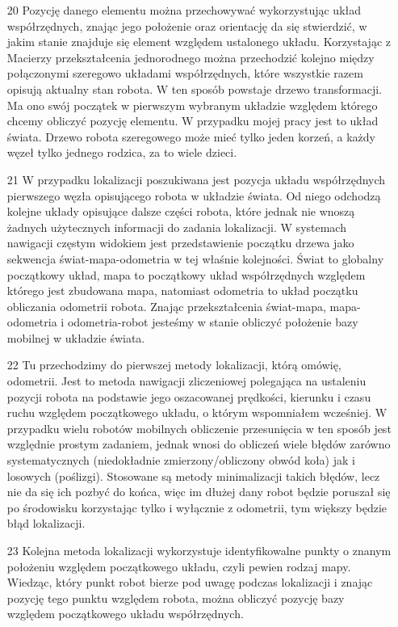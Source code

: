 \documentclass[20pt,a4paper]{article}
\begin{document}
\begin{itemize}
		\item[20]
	Pozycję danego elementu można przechowywać wykorzystując układ współrzędnych, znając jego położenie oraz orientację da się stwierdzić, w jakim stanie znajduje się element względem ustalonego układu.
Korzystając z Macierzy przekształcenia jednorodnego można przechodzić kolejno między połączonymi szeregowo układami współrzędnych, które wszystkie razem opisują aktualny stan robota.
W ten sposób powstaje drzewo transformacji. Ma ono swój początek w pierwszym wybranym układzie względem którego chcemy obliczyć pozycję elementu.
W przypadku mojej pracy jest to układ świata.
Drzewo robota szeregowego może mieć tylko jeden korzeń, a każdy węzeł tylko jednego rodzica, za to wiele dzieci.
		\item[21]
	W przypadku lokalizacji poszukiwana jest pozycja układu współrzędnych pierwszego węzła opisującego robota w układzie świata.
Od niego odchodzą kolejne układy opisujące dalsze części robota, które jednak nie wnoszą żadnych użytecznych informacji do zadania lokalizacji.
W systemach nawigacji częstym widokiem jest przedstawienie początku drzewa jako sekwencja świat-mapa-odometria w tej właśnie kolejności. 
Świat to globalny początkowy układ, mapa to początkowy układ współrzędnych względem którego jest zbudowana mapa, natomiast odometria to układ początku obliczania odometrii robota.
Znając przekształcenia świat-mapa, mapa-odometria i odometria-robot jesteśmy w stanie obliczyć położenie bazy mobilnej w układzie świata.
		\item[22]
    Tu przechodzimy do pierwszej metody lokalizacji, którą omówię, odometrii.
Jest to metoda nawigacji zliczeniowej polegająca na ustaleniu pozycji robota na podstawie jego oszacowanej prędkości, kierunku i czasu ruchu względem początkowego układu, o którym wspomniałem wcześniej.
W przypadku wielu robotów mobilnych obliczenie przesunięcia w ten sposób jest względnie prostym zadaniem, jednak wnosi do obliczeń wiele błędów zarówno systematycznych (niedokładnie zmierzony/obliczony obwód koła) jak i losowych (poślizgi). 
Stosowane są metody minimalizacji takich błędów, lecz nie da się ich pozbyć do końca, więc im dłużej dany robot będzie poruszał się po środowisku korzystając tylko i wyłącznie z odometrii, tym większy będzie błąd lokalizacji.
		\item[23]
		Kolejna metoda lokalizacji wykorzystuje identyfikowalne punkty o znanym położeniu względem początkowego układu, czyli pewien rodzaj mapy.
Wiedząc, który punkt robot bierze pod uwagę podczas lokalizacji i znając pozycję tego punktu względem robota, można obliczyć pozycję bazy względem początkowego układu współrzędnych.

\end{itemize}
\end{document}
